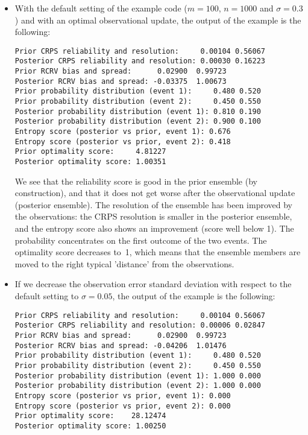 \documentclass[11pt]{article}
\begin{document}
\begin{itemize}
\item
With the default setting of the example code
($m=100$, $n=1000$ and $\sigma=0.3$)
and with an optimal observational update,
the output of the example is the following:

\begin{verbatim}
Prior CRPS reliability and resolution:     0.00104 0.56067
Posterior CRPS reliability and resolution: 0.00030 0.16223
Prior RCRV bias and spread:      0.02900  0.99723
Posterior RCRV bias and spread: -0.03375  1.00673
Prior probability distribution (event 1):     0.480 0.520
Prior probability distribution (event 2):     0.450 0.550
Posterior probability distribution (event 1): 0.810 0.190
Posterior probability distribution (event 2): 0.900 0.100
Entropy score (posterior vs prior, event 1): 0.676
Entropy score (posterior vs prior, event 2): 0.418
Prior optimality score:     4.81227
Posterior optimality score: 1.00351
\end{verbatim}

We see that the reliability score is good in the prior ensemble (by construction),
and that it does not get worse after the observational update (posterior ensemble).
The resolution of the ensemble has been improved by the observations:
the CRPS resolution is smaller in the posterior ensemble,
and the entropy score also shows an improvement (score well below 1).
The probability concentrates on the first outcome of the two events.
The optimality score decreases to~1, which means that the ensemble members
are moved to the right typical 'distance' from the observations.

\item
If we decrease the observation error standard deviation
with respect to the default setting to $\sigma=0.05$,
the output of the example is the following:

\begin{verbatim}
Prior CRPS reliability and resolution:     0.00104 0.56067
Posterior CRPS reliability and resolution: 0.00006 0.02847
Prior RCRV bias and spread:      0.02900  0.99723
Posterior RCRV bias and spread: -0.04206  1.01476
Prior probability distribution (event 1):     0.480 0.520
Prior probability distribution (event 2):     0.450 0.550
Posterior probability distribution (event 1): 1.000 0.000
Posterior probability distribution (event 2): 1.000 0.000
Entropy score (posterior vs prior, event 1): 0.000
Entropy score (posterior vs prior, event 2): 0.000
Prior optimality score:    28.12474
Posterior optimality score: 1.00250
\end{verbatim}


\end{itemize}
\end{document}
